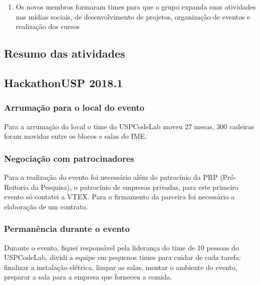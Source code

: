 \documentclass[a0,portrait]{a0poster}
\begin{document}
\begin{multicols}{2}
\begin{enumerate}
    \item Os novos membros formaram times para que o grupo expanda suas atividades nas mídias
    sociais, de desenvolvimento de projetos, organização de eventos e realização dos cursos\\[0.5cm]
\end{enumerate} 


\begin{tcolorbox}[ breakable,
                   coltext=white,
                   colback=DeepOrange,
                   colframe=DeepOrange,
                   width=36cm,
                   top=0.3cm,
                   bottom=0.4cm,
                   enlarge left by=-6mm]
    \section*{Resumo das atividades}
\end{tcolorbox}

\subsection*{HackathonUSP 2018.1}

\subsubsection*{Arrumação para o local do evento}
Para a arrumação do local o time do USPCodeLab moveu 27 mesas, 300 cadeiras foram movidas 
entre os blocos e salas do IME.

\subsubsection*{Negociação com patrocinadores}
Para a realização do evento foi necessário além do patrocínio da PRP (Pró-Reitoria da Pesquisa),
o patrocínio de empresas privadas, para este primeiro evento só contatei a VTEX. Para o firmamento
da parceira foi necessário a elaboração de um contrato.

\subsubsection*{Permanência durante o evento}
Durante o evento, fiquei responsável pela liderança do time de 10 pessoas do USPCodeLab, 
dividi a equipe em pequenos times para cuidar de cada tarefa: finalizar a instalação
elétrica, limpar as salas, montar o ambiente do evento, preparar a sala
para a empresa que forneceu a comida.


\end{multicols}
\end{document}
